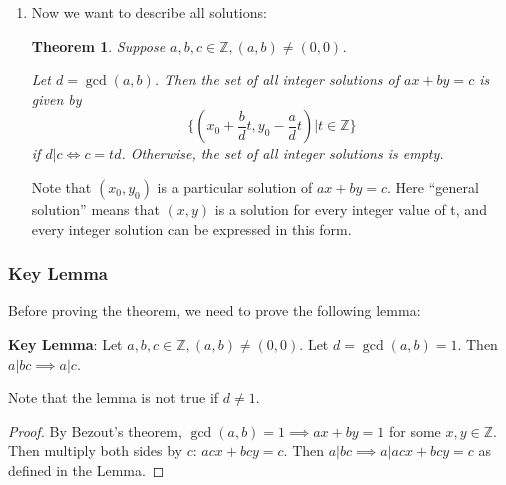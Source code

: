 \documentclass[letterpaper,12pt,oneside]{article}
\newtheorem{theorem}{Theorem}
\begin{document}
\begin{enumerate}
    \item Now we want to describe all solutions: \begin{theorem}
              Suppose $a,b,c \in \mathbb{Z}, (a,b) \neq (0,0)$.

              Let $d = \gcd(a,b)$. Then the set of all integer solutions of $ax+by=c$ is
              given by \[
                  \{(x_0+\frac{b}{d}t, y_0-\frac{a}{d}t) | t \in \mathbb{Z}\}
              \]
              if $d | c \iff c=td$. Otherwise, the set of all integer solutions is empty.
          \end{theorem}

          Note that $(x_0, y_0)$ is a particular solution of $ax+by=c$. Here ``general
          solution'' means that $(x,y)$ is a solution for every integer value of t, and
          every integer solution can be expressed in this form.
\end{enumerate}
\subsubsection{Key Lemma}\label{sec:key-lemma}
Before proving the theorem, we need to prove the following lemma:

\textbf{Key Lemma}: Let $a, b, c \in \mathbb{Z}, (a, b) \neq (0, 0)$. Let $d = \gcd(a, b) = 1$. Then $a|bc \implies a|c$.

Note that the lemma is not true if $d \neq 1$. \begin{proof}
    By Bezout's theorem, $\gcd(a,b)=1 \implies ax+by=1$ for some $x, y \in \mathbb{Z}$. Then multiply both sides by $c$: $acx+bcy=c$. Then $a|bc \implies a|acx+bcy=c$ as defined in the Lemma.
\end{proof}
\end{document}
